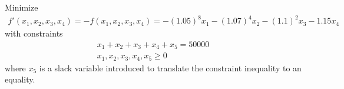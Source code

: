 \documentclass[11pt]{article}
\begin{document}
\begin{sol}
Minimize 
\begin{eqnarray*}
f'(x_{1}, x_{2}, x_{3}, x_{4}) = -f(x_{1}, x_{2}, x_{3}, x_{4}) = -(1.05)^{8}x_{1} -(1.07)^{4}x_{2} -(1.1)^{2}x_{3} -1.15x_{4}
\end{eqnarray*}
with constraints 
\begin{eqnarray*}
x_{1} + x_{2} + x_{3} + x_{4} + x_{5} = 50000 \\
x_{1}, x_{2}, x_{3}, x_{4}, x_{5} \geq 0 
\end{eqnarray*}
where $x_{5}$ is a slack variable introduced to translate the constraint inequality to an equality.
\end{sol}

\begin{comment}
\begin{sol}

This problem can be classified as an optimal control problem with 9 total states (including an initial state where no money has been invested yet). Thus, the problem can be formulated with the following parameters.\\

\textbf{Design variables:}\\ 
$\textbf{X}_{i,j}$ = amount of money invested in CD type $j$ at state $i$ \\ \\
\textbf{State variables:} \\ 
$y_{i,a}$ = amount of money available for investment at state $i$ \\
$y_{i,c}$ = amount of money accumulated thus far at state $i$ \\

\textbf{Constraints:} 
\begin{eqnarray*}
y_{0,a} = 50000 \\
y_{0,c} = 0 \\
y_{i,a} \geq 0 \\
X_{i,1} + X_{i,2} + X_{i,3} + X_{1,4} \leq y_{i,a}
\end{eqnarray*}

\textbf{Cost function:}
\begin{eqnarray*}
f(\textbf{$X_{i,j}$}) = \sum_{i=0}^{8} y_{i,c} = \sum_{i=0}^{8}(0.05X_{i-1,1} + 0.07X_{i-2,2} + 0.1X_{i-4,3} + 0.15X_{i-8,4})
\end{eqnarray*}


\end{comment}
\end{document}
